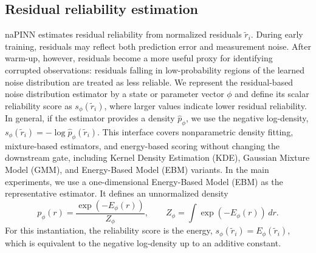 \documentclass{article}
\theoremstyle{plain}
\theoremstyle{definition}
\theoremstyle{remark}
\begin{document}
\subsection{Residual reliability estimation}
\label{subsec:residual_reliability}
naPINN estimates residual reliability from normalized residuals $\tilde r_i$. During early training, residuals may reflect both prediction error and measurement noise. After warm-up, however, residuals become a more useful proxy for identifying corrupted observations: residuals falling in low-probability regions of the learned noise distribution are treated as less reliable. We represent the residual-based noise distribution estimator by a state or parameter vector $\phi$ and define its scalar reliability score as $s_\phi(\tilde r_i)$, where larger values indicate lower residual reliability. In general, if the estimator provides a density $\hat p_\phi$, we use the negative log-density, $s_\phi(\tilde r_i)=-\log \hat p_\phi(\tilde r_i)$. This interface covers nonparametric density fitting, mixture-based estimators, and energy-based scoring without changing the downstream gate, including Kernel Density Estimation (KDE), Gaussian Mixture Model (GMM), and Energy-Based Model (EBM) variants. In the main experiments, we use a one-dimensional Energy-Based Model (EBM) as the representative estimator. It defines an unnormalized density
\begin{equation}
p_\phi(r) = \frac{\exp(-E_\phi(r))}{Z_\phi}, \qquad
Z_\phi = \int \exp(-E_\phi(r))\,dr.
\label{eq:ebm_density}
\end{equation}
For this instantiation, the reliability score is the energy, $s_\phi(\tilde r_i)=E_\phi(\tilde r_i)$, which is equivalent to the negative log-density up to an additive constant.
\end{document}
